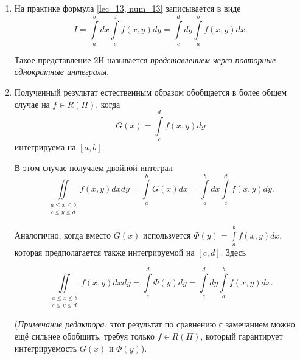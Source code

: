 \documentclass[../../main.tex]{subfiles}
\begin{document}
\begin{rems} 
	
	\quad
	
	\begin{enumerate}
		\item  На практике формула 
		\eqref {lec_13, num_13} записывается в виде 
		\[ I = \int\limits_a^b dx \int\limits_c^d f \left( x, y \right) dy = 
		\int\limits_c^d dy \int\limits_a^b f \left( x, y \right) dx. \]
		
		Такое представление 2И называется 
		\emph{представлением через 
		повторные однократные интегралы}.
		
		\item Полученный результат естественным образом обобщается в более
		общем случае на $ f \in R(\Pi)$, когда
		\[
		G \left( x \right) = \int\limits_c^d f \left( x, y \right) dy
		\]
		интегрируема на $ \left[ a, b \right] $.
		
		В этом случае получаем двойной интеграл
		\begin{equation}
		\label{lec_13, num_17}
		\underset{\substack{
				a \leq x \leq b \\
				c \leq y \leq d
		}}{\iint} f \left( x, y \right) dx dy = 
		\int\limits_a^b G \left( x \right) dx  =
		\int\limits_a^b dx \int\limits_c^d f \left( x, y \right) dy.
		\end{equation}
		
		Аналогично, когда вместо $ G \left( x \right) $ используется
		$\Phi\left( y \right) = \int\limits_a^b f \left( x, y \right) dx $, 
		которая предполагается также интегрируемой на 
		$ \left[ c, d \right]  $. Здесь
		
		\begin{equation}
		\label{lec_13, num_18}
		\underset{\substack{
				a \leq x \leq b \\
				c \leq y \leq d
		}}{\iint} f \left( x, y \right) dx dy = 
		\int\limits_c^d \Phi \left( y \right) dy  =
		\int\limits_c^d dy \int\limits_a^b f \left( x, y \right) dx.
		\end{equation}
		
		(\emph{Примечание редактора:} этот результат по сравнению с замечанием можно 
		ещё сильнее обобщить, требуя только $f\in R(\Pi)$, который гарантирует 
		интегрируемость $G(x)$ и $\Phi(y)$).
	\end{enumerate}
	
\end{rems}
\end{document}
